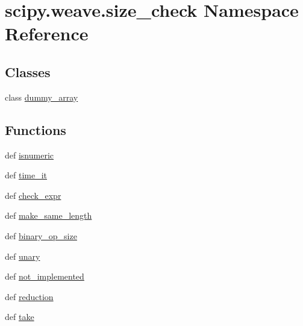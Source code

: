 \hypertarget{namespacescipy_1_1weave_1_1size__check}{}\section{scipy.\+weave.\+size\+\_\+check Namespace Reference}
\label{namespacescipy_1_1weave_1_1size__check}
\subsection*{Classes}
\begin{DoxyCompactItemize}
\item 
class \hyperlink{classscipy_1_1weave_1_1size__check_1_1dummy__array}{dummy\+\_\+array}
\end{DoxyCompactItemize}
\subsection*{Functions}
\begin{DoxyCompactItemize}
\item 
def \hyperlink{namespacescipy_1_1weave_1_1size__check_a68e6768f7544fc9c557cff6e82859b6a}{isnumeric}
\item 
def \hyperlink{namespacescipy_1_1weave_1_1size__check_a3ad97d82ceb712cd312fef873a6886bd}{time\+\_\+it}
\item 
def \hyperlink{namespacescipy_1_1weave_1_1size__check_ae90f1decc5436ab39506e3c7eb67bf10}{check\+\_\+expr}
\item 
def \hyperlink{namespacescipy_1_1weave_1_1size__check_a4958b270b4ce379897a1d5146280e1e8}{make\+\_\+same\+\_\+length}
\item 
def \hyperlink{namespacescipy_1_1weave_1_1size__check_a505669ba06d6bbc0134df0253e46eb3e}{binary\+\_\+op\+\_\+size}
\item 
def \hyperlink{namespacescipy_1_1weave_1_1size__check_a61e9f6cbb194be3d8e7ccf540af1a3c7}{unary}
\item 
def \hyperlink{namespacescipy_1_1weave_1_1size__check_ae22eede6d6ddb174c6ed2d196227c91b}{not\+\_\+implemented}
\item 
def \hyperlink{namespacescipy_1_1weave_1_1size__check_a63541aa871f606408a1c62b6f903c37c}{reduction}
\item 
def \hyperlink{namespacescipy_1_1weave_1_1size__check_a22eaf89460c3b7c3649dfe4d1f7e6af7}{take}
\end{DoxyCompactItemize}

